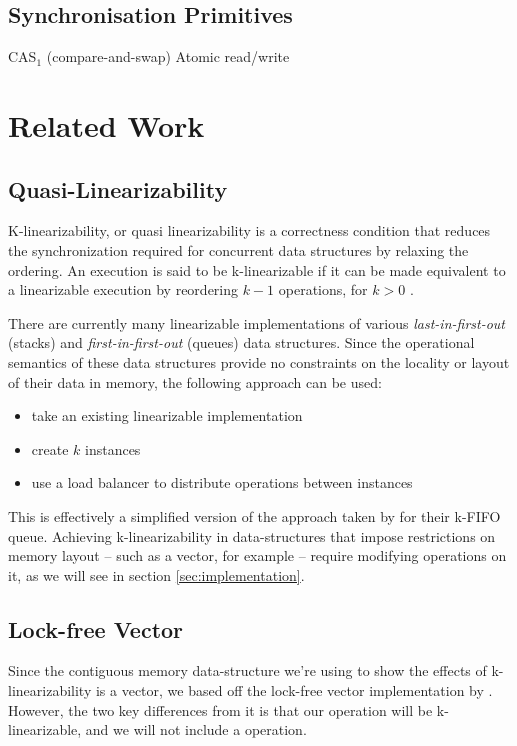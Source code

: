 \documentclass{sigplanconf}
\begin{document}
\subsection{Synchronisation Primitives}
CAS$_1$ (compare-and-swap)
Atomic read/write

\section{Related Work}

\subsection{Quasi-Linearizability}
K-linearizability, or quasi linearizability is a correctness condition
that reduces the synchronization required for concurrent data structures
by relaxing the ordering. An execution is said to be k-linearizable
if it can be made equivalent to a linearizable execution by reordering
$k-1$ operations, for $k>0$ \cite{opodis10,zhang13}.

There are currently many linearizable implementations of various \emph{last-in-first-out} (stacks) and \emph{first-in-first-out} (queues) data structures. Since the operational semantics of these data structures provide no constraints on the locality or layout of their data in memory, the following approach can be used:
\begin{itemize}
 \item take an existing linearizable implementation
 \item create $k$ instances
 \item use a load balancer to distribute operations between instances
\end{itemize}

This is effectively a simplified version of the approach taken by \citet{kfifo1} for their k-FIFO queue. Achieving k-linearizability in data-structures that impose restrictions on memory layout -- such as a vector, for example -- require modifying operations on it, as we will see in section \ref{sec:implementation}.

\subsection{Lock-free Vector}
Since the contiguous memory data-structure we're using to show the effects of k-linearizability is a vector, we based off the lock-free vector implementation by \citet{dechev06}. However, the two key differences from it is that our  operation will be k-linearizable, and we will not include a  operation.
\end{document}
